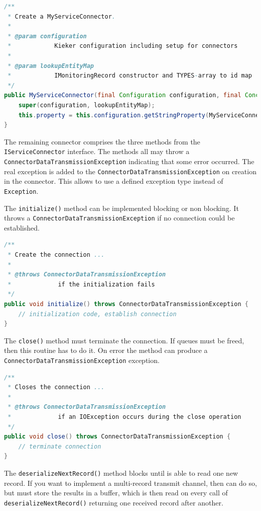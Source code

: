 \documentclass[11pt,a4paper]{article}
\begin{document}
\begin{lstlisting}[language=Java,caption=Example connector declaration]
/**
 * Create a MyServiceConnector.
 * 
 * @param configuration
 *            Kieker configuration including setup for connectors
 * 
 * @param lookupEntityMap
 *            IMonitoringRecord constructor and TYPES-array to id map
 */
public MyServiceConnector(final Configuration configuration, final ConcurrentMap<Integer, LookupEntity> lookupEntityMap) {
	super(configuration, lookupEntityMap);
	this.property = this.configuration.getStringProperty(MyServiceConnector.PROPERTY);
}
\end{lstlisting}

\noindent The remaining connector comprises the three methods from the \texttt{IServiceConnector} interface. The methods all may throw a \texttt{ConnectorDataTransmissionException} indicating that some error occurred. The real exception is added to the \texttt{ConnectorDataTransmissionException} on creation in the connector. This allows to use a defined exception type instead of \texttt{Exception}.

The \texttt{initialize()} method can be implemented blocking or non blocking. It throws a \texttt{ConnectorDataTransmissionException} if no connection could be established. 

\begin{lstlisting}[language=Java,caption=Initialization method]
/**
 * Create the connection ...
 * 
 * @throws ConnectorDataTransmissionException
 *             if the initialization fails
 */
public void initialize() throws ConnectorDataTransmissionException {
	// initialization code, establish connection
}
\end{lstlisting}

\noindent The \texttt{close()} method must terminate the connection. If queues must be freed, then this routine has to do it. On error the method can produce a \texttt{ConnectorDataTransmissionException} exception.

\begin{lstlisting}[language=Java,caption=Close method]
/**
 * Closes the connection ...
 * 
 * @throws ConnectorDataTransmissionException
 *             if an IOException occurs during the close operation
 */
public void close() throws ConnectorDataTransmissionException {
	// terminate connection
}
\end{lstlisting}

\noindent The \texttt{deserializeNextRecord()} method blocks until is able to read one new record. If you want to implement a multi-record transmit channel, then can do so, but must store the results in a buffer, which is then read on every call of \texttt{deserializeNextRecord()} returning one received record after another.
\end{document}
